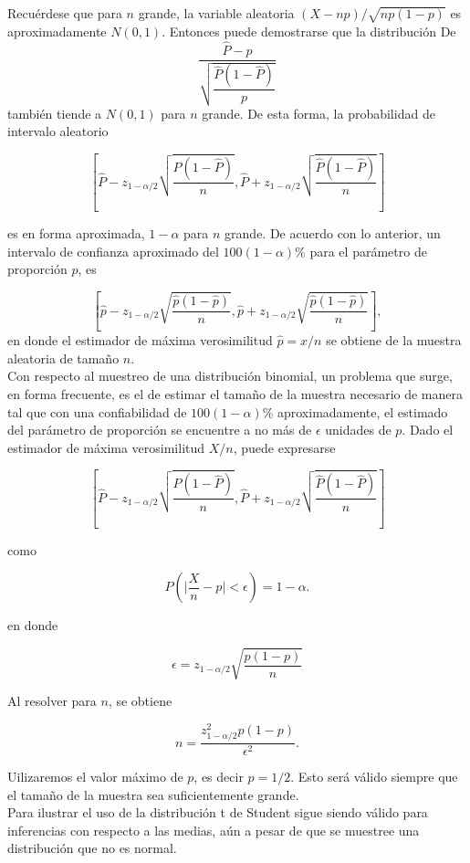 Recuérdese que para $n$ grande, la variable aleatoria $(X-np)/\sqrt{np(1-p)}$ es aproximadamente $N(0,1)$. Entonces puede demostrarse que la distribución De
$$\dfrac{\hat{P}-p}{\sqrt{\dfrac{\hat{P}\left(1-\hat{P}\right)}{p}}}$$
también tiende a $N(0,1)$ para $n$ grande. De esta forma, la probabilidad de intervalo aleatorio

$$\left[\hat{P}-z_{1-\alpha/2}\sqrt{\dfrac{\hat{P}\left(1-\hat{P}\right)}{n}},\hat{P}+z_{1-\alpha/2}\sqrt{\dfrac{\hat{P}\left(1-\hat{P}\right)}{n}}\right]$$

es en forma aproximada, $1-\alpha$ para $n$ grande. De acuerdo con lo anterior, un intervalo de confianza aproximado del $100(1-\alpha)\%$ para el parámetro de proporción $p$, es

$$\left[\hat{p}-z_{1-\alpha/2}\sqrt{\dfrac{\hat{p}\left(1-\hat{p}\right)}{n}},\hat{p}+z_{1-\alpha/2}\sqrt{\dfrac{\hat{p}\left(1-\hat{p}\right)}{n}}\right],$$
en donde el estimador de máxima verosimilitud $\hat{p}=x/n$ se obtiene de la muestra aleatoria de tamaño $n$.\\

Con respecto al muestreo de una distribución binomial, un problema que surge, en forma frecuente, es el de estimar el tamaño de la muestra necesario de manera tal que con una confiabilidad de $100(1-\alpha)\%$ aproximadamente, el estimado del parámetro de proporción se encuentre a no más de $\epsilon$ unidades de $p$. Dado el estimador de máxima verosimilitud $X/n$, puede expresarse 

$$\left[\hat{P}-z_{1-\alpha/2}\sqrt{\dfrac{\hat{P}\left(1-\hat{P}\right)}{n}},\hat{P}+z_{1-\alpha/2}\sqrt{\dfrac{\hat{P}\left(1-\hat{P}\right)}{n}}\right]$$

como

$$P\left(\Bigg|\dfrac{X}{n}-p\Bigg|<\epsilon\right) = 1-\alpha.$$

en donde

$$\epsilon = z_{1-\alpha/2}\sqrt{\dfrac{p(1-p)}{n}}$$

Al resolver para $n$, se obtiene

$$n=\dfrac{z_{1-\alpha/2}^2p(1-p)}{\epsilon^2}.$$

Uilizaremos el valor máximo de $p$, es decir $p=1/2$.  Esto será válido siempre que el tamaño de la muestra sea suficientemente grande.\\

Para ilustrar el uso de la distribución t de Student sigue siendo válido para inferencias con respecto a las medias, aún a pesar de que se muestree una distribución que no es normal.


